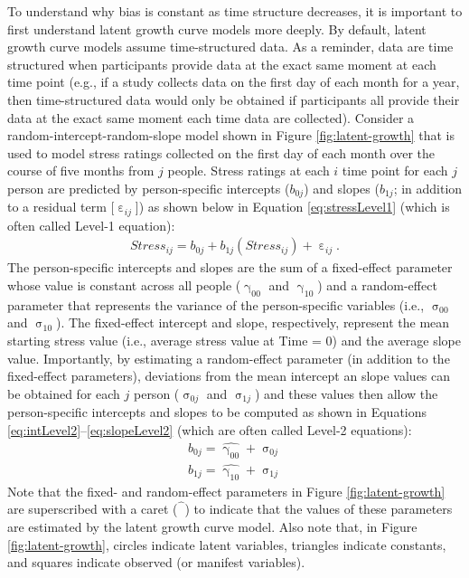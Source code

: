 \documentclass[
12pt, %
twoside,
english]{guelphthesis}
\begin{document}
To understand why bias is constant as time structure decreases, it is important to first understand latent growth curve models more deeply. By default, latent growth curve models assume time-structured data. As a reminder, data are time structured when participants provide data at the exact same moment at each time point (e.g., if a study collects data on the first day of each month for a year, then time-structured data would only be obtained if participants all provide their data at the exact same moment each time data are collected). Consider a random-intercept-random-slope model shown in Figure \ref{fig:latent-growth} that is used to model stress ratings collected on the first day of each month over the course of five months from \(j\) people. Stress ratings at each \(i\) time point for each \(j\) person are predicted by person-specific intercepts (\(b_{0j}\)) and slopes (\(b_{1j}\); in addition to a residual term {[}\(\upepsilon_{ij}\){]}) as shown below in Equation \ref{eq:stressLevel1} (which is often called Level-1 equation):
\begin{align}
  Stress_{ij} = b_{0j} + b_{1j}(Stress_{ij}) + \upepsilon_{ij}.
  \label{eq:stressLevel1}
\end{align}
\noindent The person-specific intercepts and slopes are the sum of a fixed-effect parameter whose value is constant across all people (\(\upgamma_{00}\) and \(\upgamma_{10}\)) and a random-effect parameter that represents the variance of the person-specific variables (i.e., \(\upsigma_{00}\) and \(\upsigma_{10}\)). The fixed-effect intercept and slope, respectively, represent the mean starting stress value (i.e., average stress value at Time = 0) and the average slope value. Importantly, by estimating a random-effect parameter (in addition to the fixed-effect parameters), deviations from the mean intercept an slope values can be obtained for each \(j\) person (\(\upsigma_{0j}\) and \(\upsigma_{1j}\)) and these values then allow the person-specific intercepts and slopes to be computed as shown in Equations \ref{eq:intLevel2}--\ref{eq:slopeLevel2} (which are often called Level-2 equations):
\begin{align}
  b_{0j} = \hat{\upgamma_{00}} + \upsigma_{0j} \label{eq:intLevel2} \\
  b_{1j} = \hat{\upgamma_{10}} + \upsigma_{1j} \label{eq:slopeLevel2}
\end{align}
\noindent Note that the fixed- and random-effect parameters in Figure \ref{fig:latent-growth} are superscribed with a caret (\(\hat{\phantom{\beta}}\)) to indicate that the values of these parameters are estimated by the latent growth curve model. Also note that, in Figure \ref{fig:latent-growth}, circles indicate latent variables, triangles indicate constants, and squares indicate observed (or manifest variables).
\end{document}

